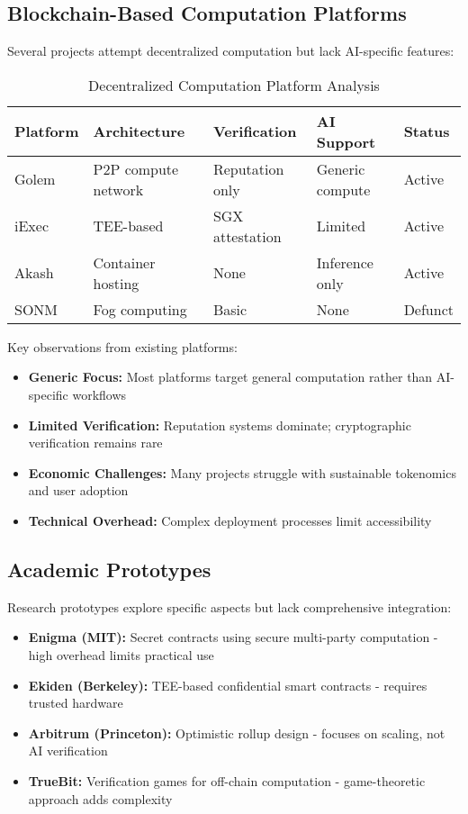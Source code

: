 \subsection{Blockchain-Based Computation Platforms}

Several projects attempt decentralized computation but lack AI-specific features:

\begin{table}[h!]
\centering
\caption{Decentralized Computation Platform Analysis}
\label{tab:decentralized-compute}
\begin{tabular}{p{2.5cm}p{3cm}p{3cm}p{2.5cm}p{2cm}}
\toprule
\textbf{Platform} & \textbf{Architecture} & \textbf{Verification} & \textbf{AI Support} & \textbf{Status} \\
\midrule
Golem & P2P compute network & Reputation only & Generic compute & Active \\
iExec & TEE-based & SGX attestation & Limited & Active \\
Akash & Container hosting & None & Inference only & Active \\
SONM & Fog computing & Basic & None & Defunct \\
\bottomrule
\end{tabular}
\end{table}

Key observations from existing platforms:
\begin{itemize}
    \item \textbf{Generic Focus:} Most platforms target general computation rather than AI-specific workflows
    \item \textbf{Limited Verification:} Reputation systems dominate; cryptographic verification remains rare
    \item \textbf{Economic Challenges:} Many projects struggle with sustainable tokenomics and user adoption
    \item \textbf{Technical Overhead:} Complex deployment processes limit accessibility
\end{itemize}

\subsection{Academic Prototypes}

Research prototypes explore specific aspects but lack comprehensive integration:

\begin{itemize}
    \item \textbf{Enigma (MIT):} Secret contracts using secure multi-party computation - high overhead limits practical use
    \item \textbf{Ekiden (Berkeley):} TEE-based confidential smart contracts - requires trusted hardware
    \item \textbf{Arbitrum (Princeton):} Optimistic rollup design - focuses on scaling, not AI verification
    \item \textbf{TrueBit:} Verification games for off-chain computation - game-theoretic approach adds complexity
\end{itemize}

